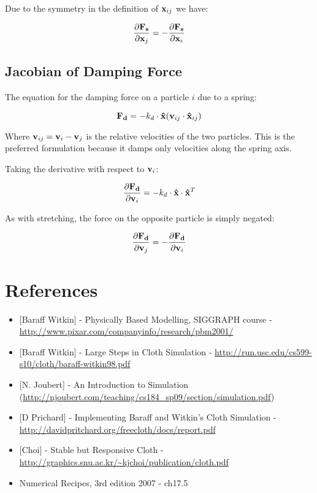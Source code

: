 \documentclass[11pt]{article}
\begin{document}
Due to the symmetry in the definition of $\mathbf{x}_{ij}$ we have:

\[\frac{\partial\mathbf{F_s}}{\partial \mathbf{x}_j}  = -\frac{\partial\mathbf{F_s}}{\partial \mathbf{x}_i}\]


\subsection{Jacobian of Damping Force}

The equation for the damping force on a particle $i$ due to a spring:

\[\mathbf{F_d} = -k_d\cdot\mathbf{\hat{x}}(\mathbf{v}_{ij}\cdot \mathbf{\hat{x}}_{ij})\]

Where $\mathbf{v}_{ij} = \mathbf{v}_i-\mathbf{v}_j$ is the relative velocities of the two particles. This is the preferred formulation because it damps only velocities along the spring axis.

Taking the derivative with respect to $\mathbf{v}_i$:

\[\frac{\partial\mathbf{F_d}}{\partial \mathbf{v}_i} = -k_d\cdot\mathbf{\hat{x}}\cdot\mathbf{\hat{x}}^T\]

As with stretching, the force on the opposite particle is simply negated:

\[\frac{\partial\mathbf{F_d}}{\partial \mathbf{v}_j} = -\frac{\partial\mathbf{F_d}}{\partial \mathbf{v}_i} \]

\section {References}

\begin{itemize}
\item{[Baraff Witkin] - Physically Based Modelling, SIGGRAPH course - \url{http://www.pixar.com/companyinfo/research/pbm2001/}}
\item{[Baraff Witkin] - Large Steps in Cloth Simulation - \url{http://run.usc.edu/cs599-s10/cloth/baraff-witkin98.pdf}}
\item{[N. Joubert] - An Introduction to Simulation (\url{http://njoubert.com/teaching/cs184_sp09/section/simulation.pdf})}
\item{[D Prichard] - Implementing Baraff and Witkin's Cloth Simulation - \url{http://davidpritchard.org/freecloth/docs/report.pdf}}
\item{[Choi] - Stable but Responsive Cloth - \url{http://graphics.snu.ac.kr/~kjchoi/publication/cloth.pdf}}
\item{Numerical Recipes, 3rd edition 2007 - ch17.5}
\end{itemize}
\end{document}
